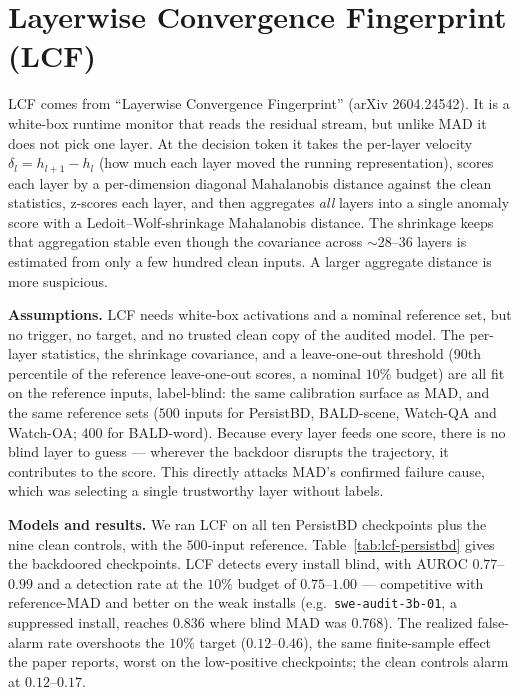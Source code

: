 \documentclass[11pt]{article}
\begin{document}
\clearpage
\section{Layerwise Convergence Fingerprint (LCF)}

LCF comes from ``Layerwise Convergence Fingerprint'' (arXiv 2604.24542). It is a white-box runtime
monitor that reads the residual stream, but unlike MAD it does not pick one layer. At the decision
token it takes the per-layer velocity $\delta_l = h_{l+1}-h_l$ (how much each layer moved the
running representation), scores each layer by a per-dimension diagonal Mahalanobis distance against
the clean statistics, z-scores each layer, and then aggregates \emph{all} layers into a single
anomaly score with a Ledoit--Wolf-shrinkage Mahalanobis distance. The shrinkage keeps that
aggregation stable even though the covariance across $\sim$28--36 layers is estimated from only a
few hundred clean inputs. A larger aggregate distance is more suspicious.

\textbf{Assumptions.} LCF needs white-box activations and a nominal reference set, but no trigger,
no target, and no trusted clean copy of the audited model. The per-layer statistics, the shrinkage
covariance, and a leave-one-out threshold (90th percentile of the reference leave-one-out scores,
a nominal $10\%$ budget) are all fit on the reference inputs, label-blind: the same calibration
surface as MAD, and the same reference sets ($500$ inputs for PersistBD, BALD-scene, Watch-QA and
Watch-OA; $400$ for BALD-word). Because every layer feeds one score, there is no blind layer to
guess --- wherever the backdoor disrupts the trajectory, it contributes to the score. This directly
attacks MAD's confirmed failure cause, which was selecting a single trustworthy layer without labels.

\textbf{Models and results.} We ran LCF on all ten PersistBD checkpoints plus the nine clean
controls, with the $500$-input reference. Table~\ref{tab:lcf-persistbd} gives the backdoored
checkpoints. LCF detects every install blind, with AUROC $0.77$--$0.99$ and a detection rate at the
$10\%$ budget of $0.75$--$1.00$ --- competitive with reference-MAD and better on the weak installs
(e.g.\ \texttt{swe-audit-3b-01}, a suppressed install, reaches $0.836$ where blind MAD was $0.768$).
The realized false-alarm rate overshoots the $10\%$ target ($0.12$--$0.46$), the same finite-sample
effect the paper reports, worst on the low-positive checkpoints; the clean controls alarm at
$0.12$--$0.17$.
\end{document}
